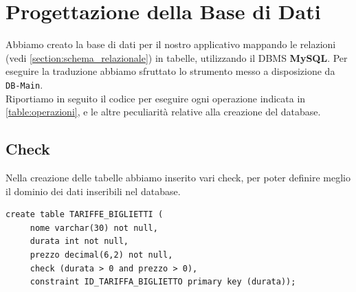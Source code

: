 \documentclass[12pt,a4paper]{report}
\begin{document}
\chapter{Progettazione della Base di Dati}\label{chapter:db}

Abbiamo creato la base di dati per il nostro applicativo mappando le relazioni (vedi \cref{section:schema_relazionale}) in tabelle, utilizzando il DBMS \textbf{MySQL}. Per eseguire la traduzione abbiamo sfruttato lo strumento messo a disposizione da \texttt{DB-Main}. \\
Riportiamo in seguito il codice per eseguire ogni operazione indicata in \cref{table:operazioni}, e le altre peculiarità relative alla creazione del database.

\section{Check}
Nella creazione delle tabelle abbiamo inserito vari check, per poter definire meglio il dominio dei dati inseribili nel database. \\

\begin{lstlisting}[style=sqlstyle, caption=Esempio di check utilizzato per definire gli attributi \texttt{prezzo} e \texttt{durata} come numeri positivi.]
create table TARIFFE_BIGLIETTI (
     nome varchar(30) not null,
     durata int not null,
     prezzo decimal(6,2) not null,
     check (durata > 0 and prezzo > 0),
     constraint ID_TARIFFA_BIGLIETTO primary key (durata));
\end{lstlisting}
\end{document}
